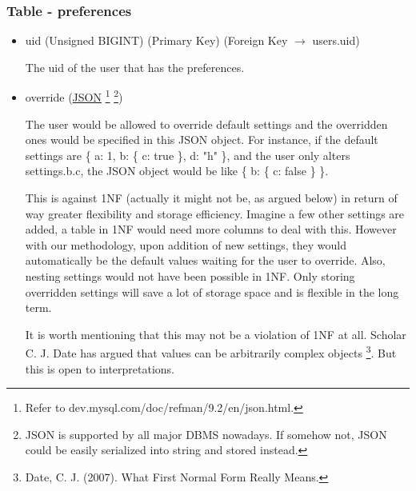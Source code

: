 \documentclass[12pt]{report}
\newcommand{\n}{\par}
\begin{document}
\subsubsection{Table - preferences} \label{data-layer.design.user-system.preferences}
\begin{itemize}
	\item uid (Unsigned BIGINT) (Primary Key) (Foreign Key $\rightarrow$ users.uid)\n
	      The uid of the user that has the preferences.
	\item override (\href{https://dev.mysql.com/doc/refman/9.2/en/json.html}{JSON}
	      \footnote{Refer to dev.mysql.com/doc/refman/9.2/en/json.html.}
	      \footnote{JSON is supported by all major DBMS nowadays. If somehow not, JSON could be easily serialized into string and stored instead.})\n
	      The user would be allowed to override default settings and the overridden ones would be specified in this JSON object.
	      For instance, if the default settings are \{ a: 1, b: \{ c: true \}, d: "h" \},
	      and the user only alters settings.b.c, the JSON object would be like \{ b: \{ c: false \} \}.\n
	      This is against 1NF (actually it might not be, as argued below) in return of way greater flexibility and storage efficiency.
	      Imagine a few other settings are added, a table in 1NF would need more columns to deal with this.
	      However with our methodology, upon addition of new settings, they would automatically be the default values waiting for the user to override.
	      Also, nesting settings would not have been possible in 1NF.
	      Only storing overridden settings will save a lot of storage space and is flexible in the long term.\n
	      It is worth mentioning that this may not be a violation of 1NF at all.
	      Scholar C. J. Date has argued that values can be arbitrarily complex objects
	      \footnote{Date, C. J. (2007). What First Normal Form Really Means.}.
	      But this is open to interpretations.
\end{itemize}
\end{document}
